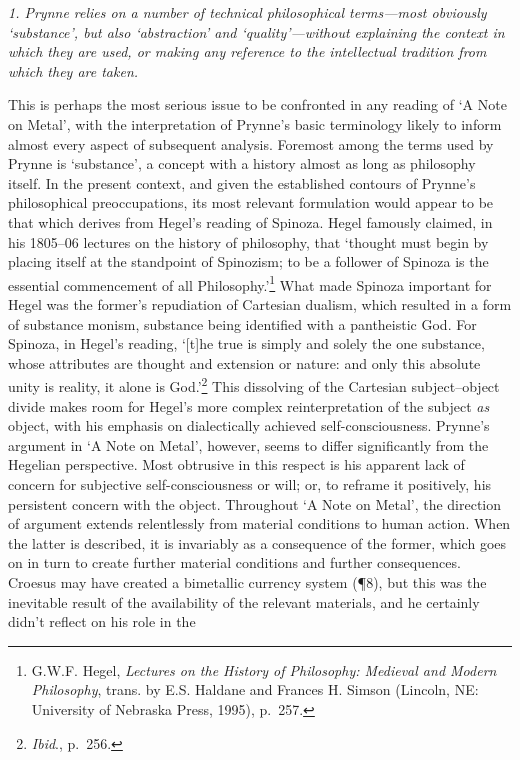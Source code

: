 \documentclass[]{article}
\begin{document}
\emph{1. Prynne relies on a number of technical philosophical terms—most
obviously ‘substance’, but also ‘abstraction’ and ‘quality’—without
explaining the context in which they are used, or making any reference
to the intellectual tradition from which they are taken.}

This is perhaps the most serious issue to be confronted in any reading
of ‘A Note on Metal’, with the interpretation of Prynne’s basic
terminology likely to inform almost every aspect of subsequent analysis.
Foremost among the terms used by Prynne is ‘substance’, a concept with a
history almost as long as philosophy itself. In the present context, and
given the established contours of Prynne’s philosophical preoccupations,
its most relevant formulation would appear to be that which derives from
Hegel’s reading of Spinoza. Hegel famously claimed, in his 1805–06
lectures on the history of philosophy, that ‘thought must begin by
placing itself at the standpoint of Spinozism; to be a follower of
Spinoza is the essential commencement of all Philosophy.’\footnote{G.W.F.
  Hegel, \emph{Lectures on the History of Philosophy: Medieval and
  Modern Philosophy}, trans. by E.S. Haldane and Frances H. Simson
  (Lincoln, NE: University of Nebraska Press, 1995), p.~257.} What made
Spinoza important for Hegel was the former’s repudiation of Cartesian
dualism, which resulted in a form of substance monism, substance being
identified with a pantheistic God. For Spinoza, in Hegel’s reading,
‘{[}t{]}he true is simply and solely the one substance, whose attributes
are thought and extension or nature: and only this absolute unity is
reality, it alone is God.’\footnote{\emph{Ibid}., p.~256.} This
dissolving of the Cartesian subject–object divide makes room for Hegel’s
more complex reinterpretation of the subject \emph{as} object, with his
emphasis on dialectically achieved self-consciousness. Prynne’s argument
in ‘A Note on Metal’, however, seems to differ significantly from the
Hegelian perspective. Most obtrusive in this respect is his apparent
lack of concern for subjective self-consciousness or will; or, to
reframe it positively, his persistent concern with the object.
Throughout ‘A Note on Metal’, the direction of argument extends
relentlessly from material conditions to human action. When the latter
is described, it is invariably as a consequence of the former, which
goes on in turn to create further material conditions and further
consequences. Croesus may have created a bimetallic currency system
(¶8), but this was the inevitable result of the availability of the
relevant materials, and he certainly didn’t reflect on his role in the
\end{document}
